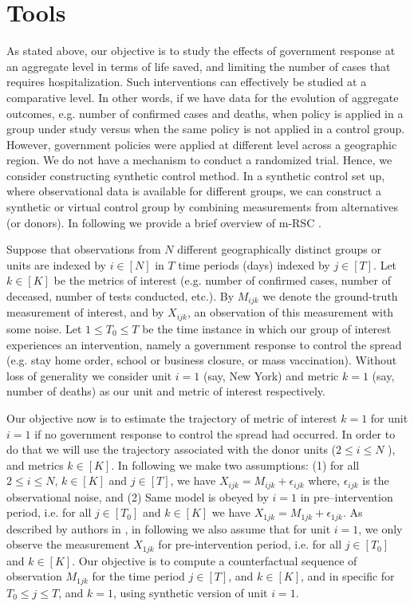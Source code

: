 \documentclass[preprint,authoryear,12pt]{elsarticle}
\begin{document}
	\section{Tools}
	\label{SEC2}
	As stated above, our objective is to study the effects of government response at an aggregate level in terms of life saved, and limiting the number of cases that requires hospitalization. Such interventions can effectively be studied at a comparative level. In other words, if we have data for the evolution of aggregate outcomes, e.g. number of confirmed cases and deaths, when policy is applied in a group under study versus when the same policy is not applied in a control group. However, government policies were applied at different level across a geographic region.  We do not have a mechanism to conduct a randomized trial. Hence, we consider constructing synthetic control method\cite{ap08746, JMLR18, AMSS19}. In a synthetic control set up, where observational data is available for different groups, we can construct a synthetic or virtual control group by combining measurements from alternatives (or donors). In following we provide a brief overview of m-RSC \cite{AMSS19}.\par
	
	Suppose that observations from $N$ different geographically distinct groups or units are indexed by $i \in [N]$ in $T$ time periods (days) indexed by $j \in [T]$. Let $k \in [K]$ be the metrics of interest (e.g. number of confirmed cases, number of deceased, number of tests conducted, etc.). By $M_{ijk}$ we denote the ground-truth measurement of interest, and by $X_{ijk}$, an observation of this measurement with some noise. Let $1 \leq T_0 \leq T$ be the time instance in which our group of interest experiences an intervention, namely a government response to control the spread (e.g. stay home order, school or business closure, or mass vaccination). Without loss of generality we consider unit $i = 1$ (say, New York) and metric $k = 1$ (say, number of deaths) as our unit and metric of interest respectively.\par
	
	Our objective now is to estimate the trajectory of metric of interest $k = 1$  for unit $i = 1$ if no government response to control the spread had occurred. In order to do that we will use the trajectory associated with the donor units ($2 \leq i \leq N$ ), and metrics $k \in [K ]$. In following we make two assumptions: (1) for all $2 \leq i \leq N$, $k \in [K]$ and $j \in [T]$, we have  $X_{ijk} = M_{ijk} + \epsilon_{ijk}$ where, $\epsilon_{ijk}$ is the observational noise, and (2) Same model is obeyed by $i=1$ in pre--intervention period, i.e. for all $j \in [T_0]$ and $k \in [K]$ we have $X_{1jk} = M_{1jk} + \epsilon_{1jk}$. As described by authors in \cite{AMSS19}, in following we also assume that for unit $i=1$, we only observe the measurement $X_{1jk}$ for pre-intervention period, i.e. for all $j \in [T_0]$ and $k \in [K]$. Our objective is to compute a counterfactual sequence of observation $M_{1jk}$ for the time period $j \in [T]$, and $k \in [K]$, and in specific for $T_0 \leq j \leq T$, and $k = 1$, using synthetic version of unit $i=1$.\par
	
\end{document}
